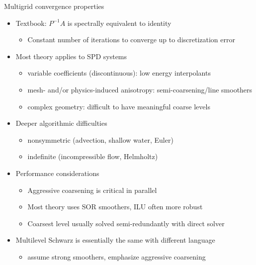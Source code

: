 \begin{frame}{Multigrid convergence properties}
  \begin{itemize}
  \item Textbook: $P^{-1}A$ is spectrally equivalent to identity
    \begin{itemize}
    \item Constant number of iterations to converge up to discretization error
    \end{itemize}
  \item Most theory applies to SPD systems
    \begin{itemize}
    \item variable coefficients (\eg discontinuous): low energy interpolants
    \item mesh- and/or physics-induced anisotropy: semi-coarsening/line smoothers
    \item complex geometry: difficult to have meaningful coarse levels
    \end{itemize}
  \item Deeper algorithmic difficulties
    \begin{itemize}
    \item nonsymmetric (\eg advection, shallow water, Euler) \\
    \item indefinite (\eg incompressible flow, Helmholtz)
    \end{itemize}
  \item Performance considerations
    \begin{itemize}
    \item Aggressive coarsening is critical in parallel
    \item Most theory uses SOR smoothers, ILU often more robust
    \item Coarsest level usually solved semi-redundantly with direct solver
    \end{itemize}
  \item Multilevel Schwarz is essentially the same with different language
    \begin{itemize}
    \item assume strong smoothers, emphasize aggressive coarsening
    \end{itemize}
  \end{itemize}
\end{frame}
